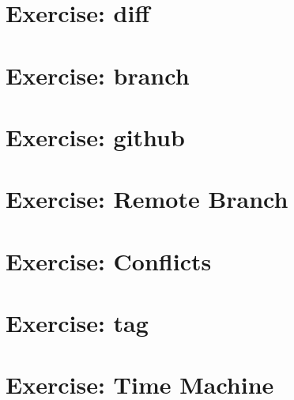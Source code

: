 \documentclass[]{article}
\begin{document}
\section{Exercise: diff}

\section{Exercise: branch}

\section{Exercise: github}

\section{Exercise: Remote Branch}

\section{Exercise: Conflicts}

\section{Exercise: tag}

\section{Exercise: Time Machine}
\end{document}

